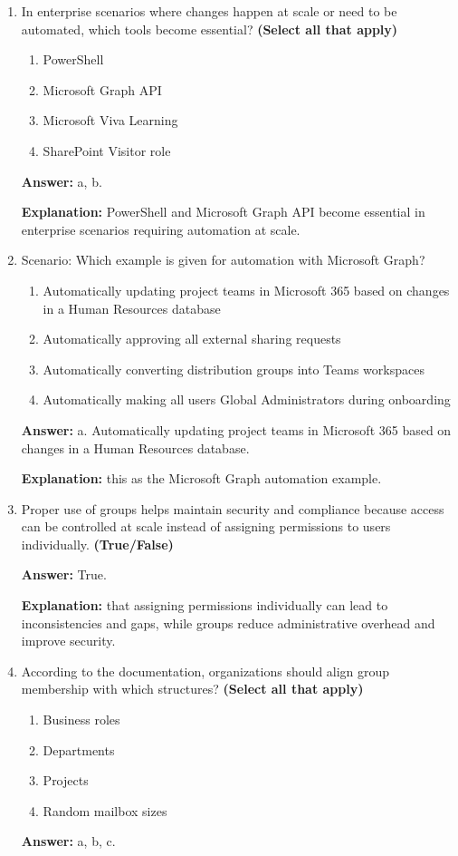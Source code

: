 \documentclass[10pt]{article}
\begin{document}
\begin{enumerate}[leftmargin=*]
\textbf{Explanation:} All four are explicitly listed in the Microsoft Entra admin center paragraph.

\item In enterprise scenarios where changes happen at scale or need to be automated, which tools become essential? \textbf{(Select all that apply)}
\begin{enumerate}[label=\alph*., leftmargin=1.5em]
\item PowerShell
\item Microsoft Graph API
\item Microsoft Viva Learning
\item SharePoint Visitor role
\end{enumerate}
\textbf{Answer:} a, b.

\textbf{Explanation:} PowerShell and Microsoft Graph API become essential in enterprise scenarios requiring automation at scale.

\item Scenario: Which example is given for automation with Microsoft Graph?
\begin{enumerate}[label=\alph*., leftmargin=1.5em]
\item Automatically updating project teams in Microsoft 365 based on changes in a Human Resources database
\item Automatically approving all external sharing requests
\item Automatically converting distribution groups into Teams workspaces
\item Automatically making all users Global Administrators during onboarding
\end{enumerate}
\textbf{Answer:} a. Automatically updating project teams in Microsoft 365 based on changes in a Human Resources database.

\textbf{Explanation:} this as the Microsoft Graph automation example.

\item Proper use of groups helps maintain security and compliance because access can be controlled at scale instead of assigning permissions to users individually. \textbf{(True/False)}

\textbf{Answer:} True.

\textbf{Explanation:} that assigning permissions individually can lead to inconsistencies and gaps, while groups reduce administrative overhead and improve security.

\item According to the documentation, organizations should align group membership with which structures? \textbf{(Select all that apply)}
\begin{enumerate}[label=\alph*., leftmargin=1.5em]
\item Business roles
\item Departments
\item Projects
\item Random mailbox sizes
\end{enumerate}
\textbf{Answer:} a, b, c.


\end{enumerate}
\end{document}

